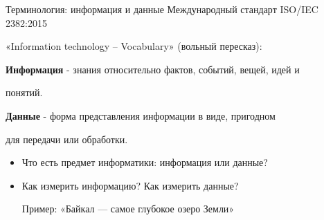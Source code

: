 \begin{frame}{Терминология: информация и данные}
\parindent=15mm
\color{black}
\noindent Международный стандарт ISO/IEC 2382:2015

\noindent«Information technology – Vocabulary» (вольный пересказ):

\color[rgb]{0,0.5,0.0}\textbf{Информация}
\color{black}
- знания относительно фактов, событий, вещей, идей и

понятий.


\color[rgb]{0,0.5,0.0}\textbf{Данные}
\color{black}
- форма представления информации в виде, пригодном

для передачи или обработки.
\vskip 2.5mm

\begin{itemize}
	\item[\textbullet] Что есть предмет информатики: информация или данные?
	\item[\textbullet] Как измерить информацию? Как измерить данные? 
	
	Пример: «Байкал — самое глубокое озеро Земли»
\end{itemize}
\end{frame}